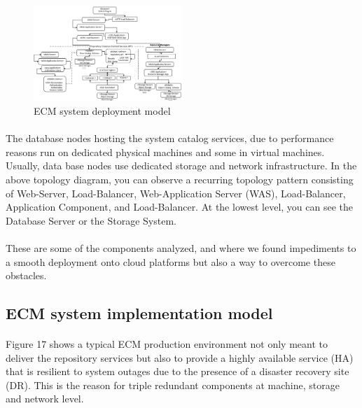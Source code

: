 \documentclass[EPiC]{easychair} %
\begin{document}
\begin{figure}[hbt!]
	\begin{centering}
	\includegraphics[width=0.5\textwidth]{pics/ECMpic16}
	\caption{ECM system deployment model}
	\label{fig:ecm-model-deployment}
	\end{centering}
\end{figure}

    \paragraph{} The database nodes hosting the system catalog services, due to performance reasons run on dedicated physical machines and some in virtual machines. Usually, data base nodes use dedicated storage and network infrastructure.  In the above topology diagram, you can observe a recurring topology pattern consisting of Web-Server, Load-Balancer, Web-Application Server (WAS), Load-Balancer, Application Component, and Load-Balancer. At the lowest level, you can see the Database Server or the Storage System.  

    \paragraph{} These are some of the components analyzed, and where we found impediments to a smooth deployment onto cloud platforms but also a way to overcome these obstacles. 

\subsection{ECM system implementation model}

    \paragraph{} Figure 17 shows a typical ECM production environment not only meant to deliver the repository services but also to provide a highly available service (HA) that is resilient to system outages due to the presence of a disaster recovery site (DR). This is the reason for triple redundant components at machine, storage and network level.
\end{document}
